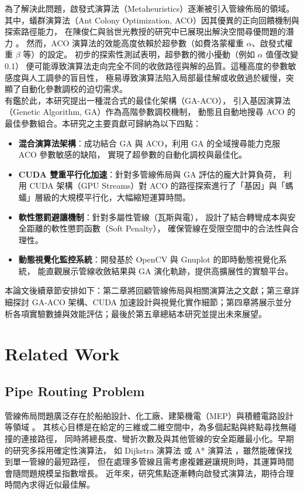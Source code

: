 \documentclass[conference]{IEEEtran}
\begin{document}
為了解決此問題，啟發式演算法（Metaheuristics）逐漸被引入管線佈局的領域。
其中，蟻群演算法（Ant Colony Optimization, ACO）因其優異的正向回饋機制與探索路徑能力，
在陳俊仁與翁世光教授的研究中已展現出解決空間尋優問題的潛力 \cite{b2}。
然而，ACO 演算法的效能高度依賴於超參數（如費洛蒙權重 $\alpha$、啟發式權重 $\beta$ 等）的設定。
初步的探索性測試表明，超參數的微小擾動（例如 $\alpha$ 值僅改變 0.1）
便可能導致演算法走向完全不同的收斂路徑與解的品質。這種高度的參數敏感度與人工調參的盲目性，
極易導致演算法陷入局部最佳解或收斂過於緩慢，突顯了自動化參數調校的迫切需求。\\

有鑑於此，本研究提出一種混合式的最佳化架構（GA-ACO），
引入基因演算法（Genetic Algorithm, GA）作為高階參數調校機制，
動態且自動地搜尋 ACO 的最佳參數組合。本研究之主要貢獻可歸納為以下四點：
\begin{itemize}
    \item \textbf{混合演算法架構}：成功結合 GA 與 ACO，利用 GA 的全域搜尋能力克服 ACO 參數敏感的缺陷，
    實現了超參數的自動化調校與最佳化。
    \item \textbf{CUDA 雙重平行化加速}：針對多管線佈局與 GA 評估的龐大計算負荷，
    利用 CUDA 架構（GPU Streams）對 ACO 的路徑探索進行了「基因」與「螞蟻」層級的大規模平行化，大幅縮短運算時間。
    \item \textbf{軟性懲罰避讓機制}：針對多屬性管線（瓦斯與電），
    設計了結合轉彎成本與安全距離的軟性懲罰函數（Soft Penalty），
    確保管線在受限空間中的合法性與合理性。
    \item \textbf{動態視覺化監控系統}：開發基於 OpenCV 與 Gnuplot 的即時動態視覺化系統，
    能直觀展示管線收斂結果與 GA 演化軌跡，提供高擴展性的實驗平台。
\end{itemize}

本論文後續章節安排如下：第二章將回顧管線佈局與相關演算法之文獻；第三章詳細探討 GA-ACO 架構、CUDA 加速設計與視覺化實作細節；第四章將展示並分析各項實驗數據與效能評估；最後於第五章總結本研究並提出未來展望。

\section{Related Work}

\subsection{Pipe Routing Problem}
管線佈局問題廣泛存在於船舶設計、化工廠、建築機電（MEP）與積體電路設計等領域 \cite{b1}。
其核心目標是在給定的三維或二維空間中，為多個起點與終點尋找無碰撞的連接路徑，
同時將總長度、彎折次數及與其他管線的安全距離最小化。早期的研究多採用確定性演算法，
如 Dijkstra 演算法 \cite{b3} 或 A* 演算法 \cite{b4}，雖然能確保找到單一管線的最短路徑，
但在處理多管線且需考慮複雜避讓規則時，其運算時間會隨問題規模呈指數增長。
近年來，研究焦點逐漸轉向啟發式演算法，期待合理時間內求得近似最佳解。
\end{document}
